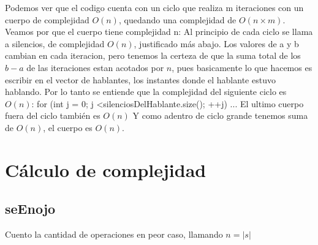 \documentclass{article}
\begin{document}
Podemos ver que el codigo cuenta con un ciclo que realiza m iteraciones con un cuerpo de complejidad $O(n)$, quedando una
complejidad de $O(n\times m)$. \newline
Veamos por que el cuerpo tiene complejidad n: \newline
Al principio de cada ciclo se llama a silencios, de complejidad $O(n)$, justificado más abajo. \newline
Los valores de a y b cambian en cada iteracion, pero tenemos la certeza de que la suma total de los $b-a$ de las
iteraciones estan acotados por $n$, pues basicamente lo que hacemos es escribir en el vector de hablantes, los instantes
donde el hablante estuvo hablando. Por lo tanto se entiende que la complejidad del siguiente ciclo es $O(n)$: \newline
for (int j = 0; j \textless silenciosDelHablante.size(); ++j) { \newline
    ... \newline
} \newline
El ultimo cuerpo fuera del ciclo también es $O(n)$ \newline
Y como adentro de ciclo grande tenemos suma de $O(n)$, el cuerpo es $O(n)$. \newline

\newpage
{}
\section*{Cálculo de complejidad}
\vspace{0.5cm}
\subsection{seEnojo}
Cuento la cantidad de operaciones en peor caso, llamando $n=|s|$
\end{document}
